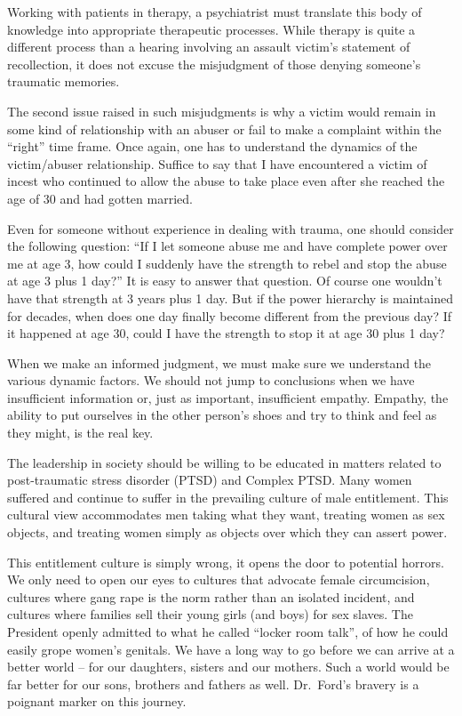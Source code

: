 \documentclass[]{book}
\begin{document}
Working with patients in therapy, a psychiatrist must translate this body of knowledge into appropriate therapeutic processes. While therapy is quite a different process than a hearing involving an assault victim's statement of recollection, it does not excuse the misjudgment of those denying someone's traumatic memories.

The second issue raised in such misjudgments is why a victim would remain in some kind of relationship with an abuser or fail to make a complaint within the ``right'' time frame. Once again, one has to understand the dynamics of the victim/abuser relationship. Suffice to say that I have encountered a victim of incest who continued to allow the abuse to take place even after she reached the age of 30 and had gotten married.

Even for someone without experience in dealing with trauma, one should consider the following question: ``If I let someone abuse me and have complete power over me at age 3, how could I suddenly have the strength to rebel and stop the abuse at age 3 plus 1 day?'' It is easy to answer that question. Of course one wouldn't have that strength at 3 years plus 1 day. But if the power hierarchy is maintained for decades, when does one day finally become different from the previous day? If it happened at age 30, could I have the strength to stop it at age 30 plus 1 day?

When we make an informed judgment, we must make sure we understand the various dynamic factors. We should not jump to conclusions when we have insufficient information or, just as important, insufficient empathy. Empathy, the ability to put ourselves in the other person's shoes and try to think and feel as they might, is the real key.

The leadership in society should be willing to be educated in matters related to post-traumatic stress disorder (PTSD) and Complex PTSD. Many women suffered and continue to suffer in the prevailing culture of male entitlement. This cultural view accommodates men taking what they want, treating women as sex objects, and treating women simply as objects over which they can assert power.

This entitlement culture is simply wrong, it opens the door to potential horrors. We only need to open our eyes to cultures that advocate female circumcision, cultures where gang rape is the norm rather than an isolated incident, and cultures where families sell their young girls (and boys) for sex slaves. The President openly admitted to what he called ``locker room talk'', of how he could easily grope women's genitals. We have a long way to go before we can arrive at a better world -- for our daughters, sisters and our mothers. Such a world would be far better for our sons, brothers and fathers as well. Dr.~Ford's bravery is a poignant marker on this journey.
\end{document}

